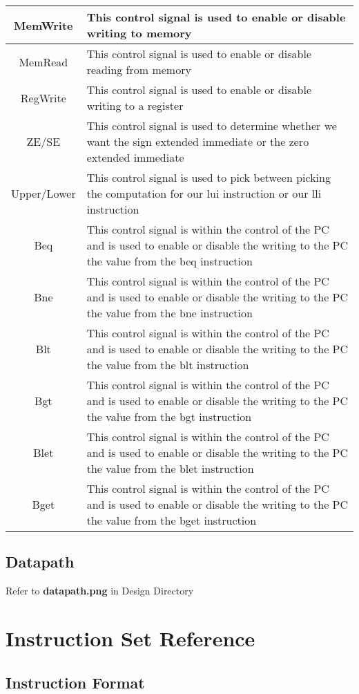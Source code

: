 \documentclass[12pt, a4paper]{report}
\begin{document}
{\begin{longtable}[c]{c|p{11cm}}
				\hline
				MemWrite & This control signal is used to enable or disable writing to memory \\
				\hline
				MemRead & This control signal is used to enable or disable reading from memory \\
				\hline
				RegWrite & This control signal is used to enable or disable writing to a register \\
				\hline
				ZE/SE & This control signal is used to determine whether we want the sign extended immediate or the zero extended immediate \\
				\hline
				Upper/Lower & This control signal is used to pick between picking the computation for our lui instruction or our lli instruction \\
				\hline
				Beq & This control signal is within the control of the PC and is used to enable or disable the writing to the PC the value from the beq instruction \\
				\hline
				Bne & This control signal is within the control of the PC and is used to enable or disable the writing to the PC the value from the bne instruction \\
				\hline
				Blt & This control signal is within the control of the PC and is used to enable or disable the writing to the PC the value from the blt instruction \\
				\hline
				Bgt & This control signal is within the control of the PC and is used to enable or disable the writing to the PC the value from the bgt instruction \\
				\hline
				Blet & This control signal is within the control of the PC and is used to enable or disable the writing to the PC the value from the blet instruction\\
				Bget & This control signal is within the control of the PC and is used to enable or disable the writing to the PC the value from the bget instruction
		\end{longtable}}
		\pagebreak
	
	\section{Datapath}
	Refer to \textbf{datapath.png} in Design Directory
	
	\chapter{Instruction Set Reference}
	
	\section{Instruction Format}
\end{document}
